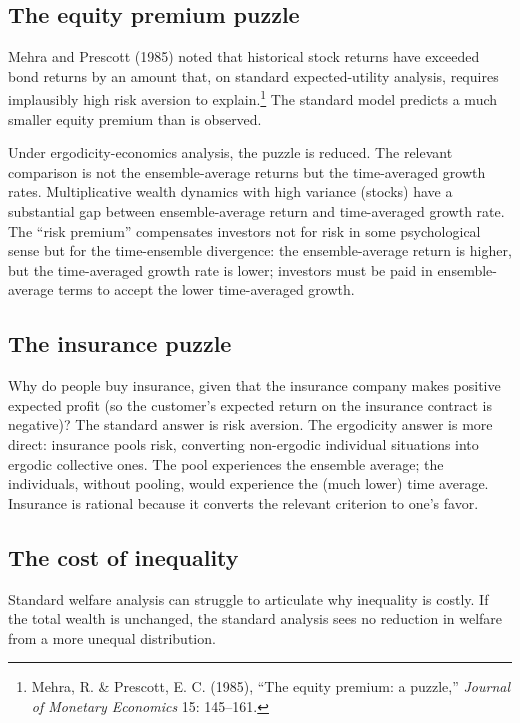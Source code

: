 \subsection{The equity premium puzzle}

Mehra and Prescott (1985) noted that historical stock returns have
exceeded bond returns by an amount that, on standard expected-utility
analysis, requires implausibly high risk aversion to
explain.\footnote{Mehra, R. \& Prescott, E. C. (1985), ``The equity
premium: a puzzle,'' \emph{Journal of Monetary Economics} 15:
145--161.} The standard model predicts a much smaller equity
premium than is observed.

Under ergodicity-economics analysis, the puzzle is reduced. The
relevant comparison is not the ensemble-average returns but the
time-averaged growth rates. Multiplicative wealth dynamics with
high variance (stocks) have a substantial gap between
ensemble-average return and time-averaged growth rate. The
``risk premium'' compensates investors not for risk in some
psychological sense but for the time-ensemble divergence: the
ensemble-average return is higher, but the time-averaged growth
rate is lower; investors must be paid in ensemble-average terms to
accept the lower time-averaged growth.

\subsection{The insurance puzzle}

Why do people buy insurance, given that the insurance company makes
positive expected profit (so the customer's expected return on the
insurance contract is negative)? The standard answer is risk
aversion. The ergodicity answer is more direct: insurance pools
risk, converting non-ergodic individual situations into ergodic
collective ones. The pool experiences the ensemble average; the
individuals, without pooling, would experience the (much lower)
time average. Insurance is rational because it converts the
relevant criterion to one's favor.

\subsection{The cost of inequality}

Standard welfare analysis can struggle to articulate why inequality
is costly. If the total wealth is unchanged, the standard analysis
sees no reduction in welfare from a more unequal distribution.

